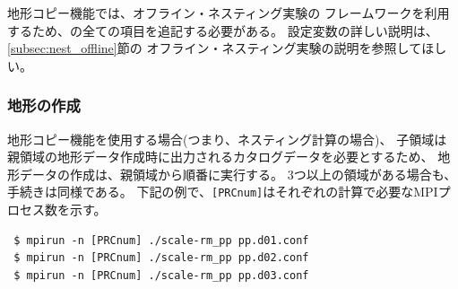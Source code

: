 地形コピー機能では、オフライン・ネスティング実験の
フレームワークを利用するため、の全ての項目を追記する必要がある。
設定変数の詳しい説明は、\ref{subsec:nest_offline}節の
オフライン・ネスティング実験の説明を参照してほしい。


\subsubsection{地形の作成}

地形コピー機能を使用する場合(つまり、ネスティング計算の場合)、
子領域は親領域の地形データ作成時に出力されるカタログデータを必要とするため、
地形データの作成は、親領域から順番に実行する。
3つ以上の領域がある場合も、手続きは同様である。
下記の例で、\verb|[PRCnum]|はそれぞれの計算で必要なMPIプロセス数を示す。

\begin{verbatim}
 $ mpirun -n [PRCnum] ./scale-rm_pp pp.d01.conf
 $ mpirun -n [PRCnum] ./scale-rm_pp pp.d02.conf
 $ mpirun -n [PRCnum] ./scale-rm_pp pp.d03.conf
\end{verbatim}

